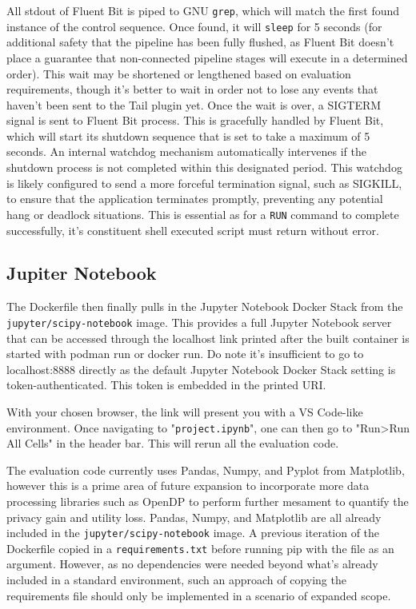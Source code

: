 All stdout of Fluent Bit is piped to GNU \texttt{grep}, which will match the first found instance of the control sequence. Once found, it will \texttt{sleep} for 5 seconds (for additional safety that the pipeline has been fully flushed, as Fluent Bit doesn't place a guarantee that non-connected pipeline stages will execute in a determined order). This wait may be shortened or lengthened based on evaluation requirements, though it's better to wait in order not to lose any events that haven't been sent to the Tail plugin yet. Once the wait is over, a SIGTERM signal is sent to Fluent Bit process. This is gracefully handled by Fluent Bit, which will start its shutdown sequence that is set to take a maximum of 5 seconds. An internal watchdog mechanism automatically intervenes if the shutdown process is not completed within this designated period. This watchdog is likely configured to send a more forceful termination signal, such as SIGKILL, to ensure that the application terminates promptly, preventing any potential hang or deadlock situations. This is essential as for a \texttt{RUN} command to complete successfully, it's constituent shell executed script must return without error.


\subsection{Jupiter Notebook}
The Dockerfile then finally pulls in the Jupyter Notebook Docker Stack from the \texttt{jupyter/scipy-notebook} image. This provides a full Jupyter Notebook server that can be accessed through the localhost link printed after the built container is started with podman run or docker run. Do note it's insufficient to go to localhost:8888 directly as the default Jupyter Notebook Docker Stack setting is token-authenticated. This token is embedded in the printed URI. 

With your chosen browser, the link will present you with a VS Code-like environment. Once navigating to "\texttt{project.ipynb}", one can then go to "Run>Run All Cells" in the header bar. This will rerun all the evaluation code.

The evaluation code currently uses Pandas, Numpy, and Pyplot from Matplotlib, however this is a prime area of future expansion to incorporate more data processing libraries such as OpenDP to perform further mesament to quantify the privacy gain and utility loss. Pandas, Numpy, and Matplotlib are all already included in the \texttt{jupyter/scipy-notebook} image. A previous iteration of the Dockerfile copied in a \texttt{requirements.txt} before running pip with the file as an argument. However, as no dependencies were needed beyond what's already included in a standard environment, such an approach of copying the requirements file should only be implemented in a scenario of expanded scope.



